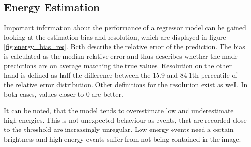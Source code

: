 \subsection{Energy Estimation}
\label{energy_model}




Important information about the performance of a regressor model can be gained
looking at the estimation bias and resolution,
which are displayed in figure \ref{fig:energy_bias_res}.
Both describe the relative error of the prediction.
The bias is calculated as the median relative error and thus describes
whether the made predictions are on average matching the true values.
Resolution on the other hand is defined as
half the difference between the \num{15.9} and \num{84.1}th percentile
of the relative error distribution.
Other definitions for the resolution exist as well.
In both cases, values closer to 0 are better.

It can be noted, that the model tends to overestimate low and underestimate high energies.
This is not unexpected behaviour as events, that are recorded close to the threshold are increasingly
unregular. Low energy events need a certain brightness and high energy events suffer from
not being contained in the image.

